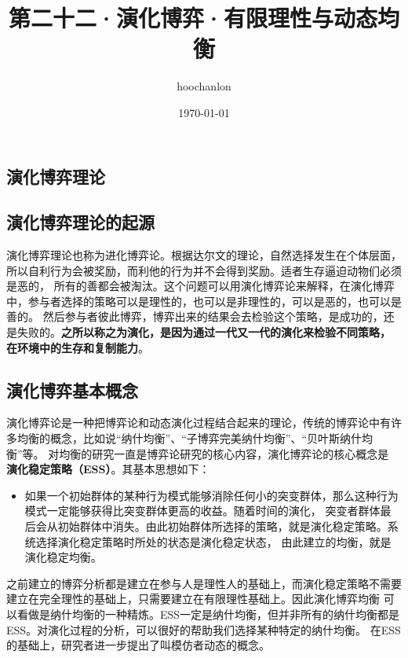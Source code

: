 \documentclass[12pt, a4paper]{article} %
\title{第二十二·演化博弈·有限理性与动态均衡}
\author{hoochanlon}
\date{\today}
\begin{document}
	\begin{CJK*}{UTF8}{gbsn}
		\maketitle
        \clearpage
        \section{演化博弈理论}
        \subsection{演化博弈理论的起源}
        演化博弈理论也称为进化博弈论。根据达尔文的理论，自然选择发生在个体层面，所以自利行为会被奖励，而利他的行为并不会得到奖励。适者生存逼迫动物们必须是恶的，
        所有的善都会被淘汰。这个问题可以用演化博弈论来解释，在演化博弈中，参与者选择的策略可以是理性的，也可以是非理性的，可以是恶的，也可以是善的。
        然后参与者彼此博弈，博弈出来的结果会去检验这个策略，是成功的，还是失败的。\textbf{之所以称之为演化，是因为通过一代又一代的演化来检验不同策略，
        在环境中的生存和复制能力}。

        \subsection{演化博弈基本概念}
        演化博弈论是一种把博弈论和动态演化过程结合起来的理论，传统的博弈论中有许多均衡的概念，比如说“纳什均衡”、“子博弈完美纳什均衡”、“贝叶斯纳什均衡”等。
        对均衡的研究一直是博弈论研究的核心内容，演化博弈论的核心概念是 \textbf{演化稳定策略（ESS）}。其基本思想如下：

        \begin{itemize}
            \item[] 如果一个初始群体的某种行为模式能够消除任何小的突变群体，那么这种行为模式一定能够获得比突变群体更高的收益。随着时间的演化，
                    突变者群体最后会从初始群体中消失。由此初始群体所选择的策略，就是演化稳定策略。系统选择演化稳定策略时所处的状态是演化稳定状态，
                    由此建立的均衡，就是演化稳定均衡。
        \end{itemize}

        之前建立的博弈分析都是建立在参与人是理性人的基础上，而演化稳定策略不需要建立在完全理性的基础上，只需要建立在有限理性基础上。因此演化博弈均衡
        可以看做是纳什均衡的一种精炼。ESS一定是纳什均衡，但并非所有的纳什均衡都是ESS。对演化过程的分析，可以很好的帮助我们选择某种特定的纳什均衡。
        在ESS的基础上，研究者进一步提出了叫模仿者动态的概念。


\end{CJK*}
\end{document}
